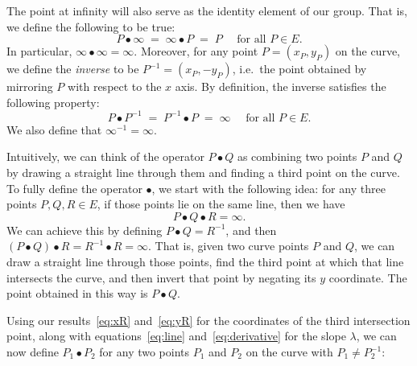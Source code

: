 \documentclass{article}
\begin{document}
The point at infinity will also serve as the identity element of our group.
That is, we define the following to be true:
\begin{equation}
P \bullet \infty \;=\; \infty \bullet P \;=\; P \quad\text{ for all } P \in E. \label{eq:law-identity}
\end{equation}
In particular, $\infty\bullet\infty=\infty$.
Moreover, for any point $P = (x_P, y_P)$ on the curve, we define the \emph{inverse} to be $P^{-1} = (x_P, -y_P)$, i.e.\ the point obtained by mirroring $P$ with respect to the $x$ axis.
By definition, the inverse satisfies the following property:
\begin{equation}
P \bullet P^{-1} \;=\; P^{-1} \bullet P \;=\; \infty \quad\text{ for all } P \in E. \label{eq:law-inverse}
\end{equation}
We also define that $\infty^{-1} = \infty$.

Intuitively, we can think of the operator $P \bullet Q$ as combining two points $P$ and $Q$ by drawing a straight line through them and finding a third point on the curve.
To fully define the operator $\bullet$, we start with the following idea: for any three points $P, Q, R \in E$, if those points lie on the same line, then we have
\begin{equation}
P \bullet Q \bullet R = \infty.
\end{equation}
We can achieve this by defining $P \bullet Q = R^{-1}$, and then $(P \bullet Q) \bullet R = R^{-1} \bullet R = \infty$.
That is, given two curve points $P$ and $Q$, we can draw a straight line through those points, find the third point at which that line intersects the curve, and then invert that point by negating its $y$ coordinate.
The point obtained in this way is $P \bullet Q$.

Using our results~\eqref{eq:xR} and~\eqref{eq:yR} for the coordinates of the third intersection point, along with equations~\eqref{eq:line} and~\eqref{eq:derivative} for the slope $\lambda$, we can now define $P_1 \bullet P_2$ for any two points $P_1$ and $P_2$ on the curve with $P_1 \neq P_2^{-1}$:
\end{document}
